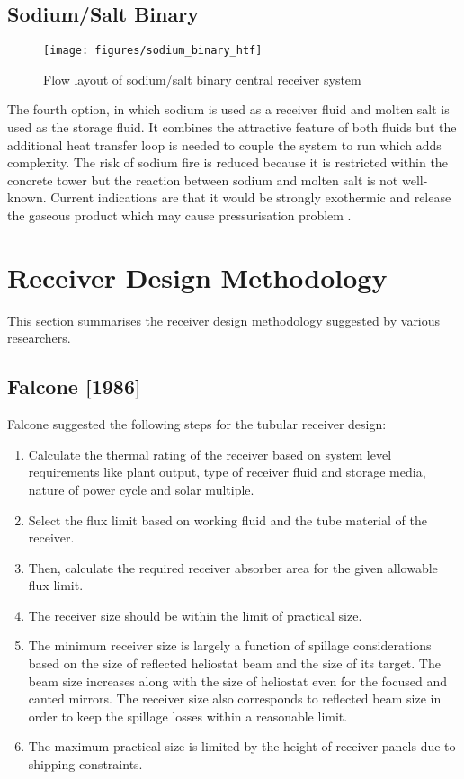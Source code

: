 \subsection{Sodium/Salt Binary}
\begin{figure}[h!]
	\texttt{[image: figures/sodium\_binary\_htf]}
	\centering
	\caption{Flow layout of sodium/salt binary central receiver system \cite{Falcone.1986}}
\end{figure}
\noindent The fourth option, in which sodium is used as a receiver fluid and molten salt is used as the storage fluid. It combines the attractive feature of both fluids but the additional heat transfer loop is needed to couple the system to run which adds complexity. The risk of sodium fire is reduced because it is restricted within the concrete tower but the reaction between sodium and molten salt is not well-known. Current indications are that it would be strongly exothermic and release the gaseous product which may cause pressurisation problem \cite{Falcone.1986}.

\section{Receiver Design Methodology}
This section summarises the receiver design methodology suggested by various researchers.

\subsection{Falcone [1986] \cite{Falcone.1986}}
Falcone \cite{Falcone.1986} suggested the following steps for the tubular receiver design: 
\begin{enumerate}
	\item Calculate the thermal rating of the receiver based on system level requirements like plant output, type of receiver fluid and storage media, nature of power cycle and solar multiple.
	\item Select the flux limit based on working fluid and the tube material of the receiver.
	\item Then, calculate the required receiver absorber area for the given allowable flux limit.
	\item The receiver size should be within the limit of practical size.
	\item The minimum receiver size is largely a function of spillage considerations based on the size of reflected heliostat beam and the size of its target. The beam size increases along with the size of heliostat even for the focused and canted mirrors. The receiver size also corresponds to reflected beam size in order to keep the spillage losses within a reasonable limit.
	\item The maximum practical size is limited by the height of receiver panels due to shipping constraints.
\end{enumerate}
